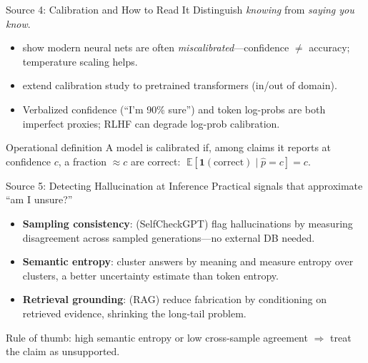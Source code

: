 \documentclass[aspectratio=169,11pt]{beamer}
\begin{document}
\begin{frame}{Source 4: Calibration and How to Read It}
  Distinguish \emph{knowing} from \emph{saying you know}.
  \begin{itemize}
    \item \citet{guo2017calibration} show modern neural nets are often \emph{miscalibrated}---confidence $\neq$ accuracy; temperature scaling helps.
    \item \citet{desai2020calibration} extend calibration study to pretrained transformers (in/out of domain).
    \item Verbalized confidence (``I'm 90\% sure'') and token log-probs are both imperfect proxies; RLHF can degrade log-prob calibration.
  \end{itemize}
  \begin{block}{Operational definition}
    A model is calibrated if, among claims it reports at confidence $c$, a fraction $\approx c$ are correct: $\;\mathbb{E}[\mathbf{1}(\text{correct})\mid \hat{p}=c]=c.$
  \end{block}
\end{frame}

\begin{frame}{Source 5: Detecting Hallucination at Inference}
  Practical signals that approximate ``am I unsure?''
  \begin{itemize}
    \item \textbf{Sampling consistency}: \citet{manakul2023selfcheckgpt} (SelfCheckGPT) flag hallucinations by measuring disagreement across sampled generations---no external DB needed.
    \item \textbf{Semantic entropy}: \citet{kuhn2023semantic} cluster answers by meaning and measure entropy over clusters, a better uncertainty estimate than token entropy.
    \item \textbf{Retrieval grounding}: \citet{lewis2020retrieval} (RAG) reduce fabrication by conditioning on retrieved evidence, shrinking the long-tail problem.
  \end{itemize}
  Rule of thumb: high semantic entropy or low cross-sample agreement $\Rightarrow$ treat the claim as unsupported.
\end{frame}
\end{document}
